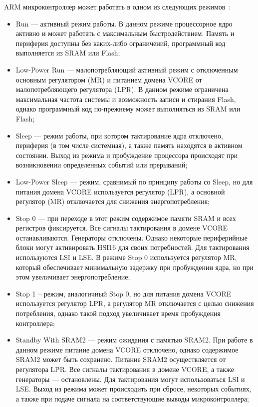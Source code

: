 \documentclass[12pt, oneside]{altsu-report}
\begin{document}
ARM микроконтроллер может работать в одном из следующих режимов~\cite{Power_ARM}:

\begin{itemize}
    \item Run --- активный режим работы. В данном режиме процессорное ядро активно и может работать с максимальным быстродействием. Память и периферия доступны без каких-либо ограничений, программный код выполняется из SRAM или Flash;
    
    \item Low-Power Run --- малопотребляющий активный режим с отключенным основным регулятором (MR) и питанием домена VCORE от малопотребляющего регулятора (LPR). В данном режиме ограничена максимальная частота системы и возможность записи и стирания Flash, однако программный код по-прежнему может выполняться из SRAM или Flash;
    
    \item Sleep --- режим работы, при котором тактирование ядра отключено, периферия (в том числе системная), а также память находятся в активном состоянии. Выход из режима и пробуждение процессора происходят при возникновении определенных событий или прерываний;
    
    \item Low-Power Sleep --- режим, сравнимый по принципу работы со Sleep, но для питания домена VCORE используется регулятор (LPR), а основной регулятор (MR) отключается для снижения энергопотребления;
    
    \item Stop 0 --- при переходе в этот режим содержимое памяти SRAM и всех регистров фиксируется. Все сигналы тактирования в домене VCORE останавливаются. Генераторы отключены. Однако некоторые периферийные блоки могут активировать HSI16 для своих потребностей. Для тактирования используются LSI и LSE. В режиме Stop 0 используется регулятор MR, который обеспечивает минимальную задержку при пробуждении ядра, но при этом увеличивает энергопотребление;
    
    \item Stop 1 – режим, аналогичный Stop 0, но для питания домена VCORE используется регулятор LPR, а регулятор MR отключается с целью снижения потребления, однако такой подход увеличивает время пробуждения контроллера;
    
    \item Standby With SRAM2 --- режим ожидания с памятью SRAM2. При работе в данном режиме питание домена VCORE отключено, однако содержимое SRAM2 может быть сохранено. Питание SRAM2 осуществляется от регулятора LPR. Все сигналы тактирования в домене VCORE, а также генераторы --- остановлены. Для тактирования могут использоваться LSI и LSE. Выход из режима может происходить при сбросе, некоторых событиях, а также при подаче сигнала на соответствующие выводы микроконтроллера;
    

\end{itemize}
\end{document}
